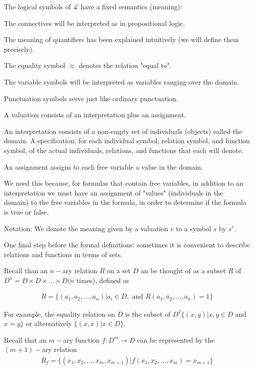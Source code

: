 \documentclass{article}
\begin{document}
The logical symbols of $\mathcal{L}$ have a fixed semantics (meaning):

The connectives will be interpreted as in propositional logic.

The meaning of quantifiers has been explained intuitively (we will define them precisely).

The equality symbol $\approx$ denotes the relation "equal to".

The variable symbols will be interpreted as variables ranging over the domain.

Punctuation symbols serve just like ordinary punctuation.

A valuation consists of an interpretation plus an assignment.

An interpretation consists of a non-empty set of individuals (objects) called the domain. A specification, for each individual symbol, relation symbol, and function symbol, of the actual individuals, relations, and functions that each will denote.

An assignment assigns to each free variable a value in the domain.

We need this because, for formulas that contain free variables, in addition to an interpretation we must have an assignment of "values" (individuals in the domain) to the free variables in the formula, in order to determine if the formula is true or false.

Notation: We denote the meaning given by a valuation $v$ to a symbol $s$ by $s^v$.

One final step before the formal definitions: sometimes it is convenient to describe relations and functions in terms of sets. 

Recall than an $n-$ary relation $R$ on a set $D$ an be thought of as a subset $R$ of $D^n = D \times D \times \ldots \times D (n$ times), defined as

\begin{align*}
R = \{(a_1, a_2, \ldots, a_n) | a_i \in D, \text{ and } R(a_1, a_2, \ldots, a_n) = 1 \}
\end{align*}

For example, the equality relation on $D$ is the subset of $D^2 \{(x,y) | x,y \in D$ and $x = y \}$ or alternatively $\{(x,x)| x \in D\}$.

Recall that an $m-$ary function $f: D^m \longrightarrow D$ can be represented by the $(m+1)-$ary relation
\begin{align*}
R_f = \{(x_1, x_2, \ldots, x_m, x_{m+1}) | f(x_1, x_2, \ldots, x_m) = x_{m+1} \}
\end{align*}
\end{document}
